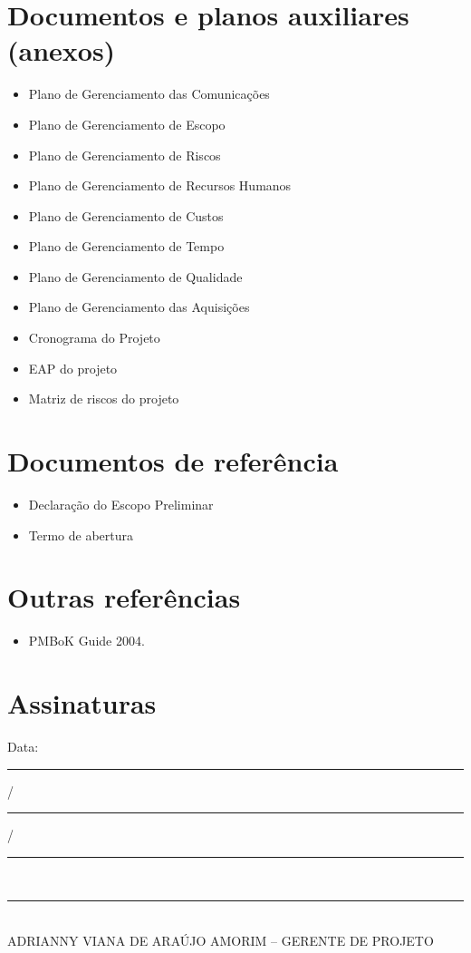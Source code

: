 \section*{Documentos e planos auxiliares (anexos)}
\begin{itemize}
\item Plano de Gerenciamento das Comunicações
\item Plano de Gerenciamento de Escopo
\item Plano de Gerenciamento de Riscos
\item Plano de Gerenciamento de Recursos Humanos
\item Plano de Gerenciamento de Custos
\item Plano de Gerenciamento de Tempo
\item Plano de Gerenciamento de Qualidade
\item Plano de Gerenciamento das Aquisições
\item Cronograma do Projeto
\item EAP do projeto
\item Matriz de riscos do projeto


\end{itemize}

\section*{Documentos de referência}
\begin{itemize}
\item Declaração do Escopo Preliminar
\item Termo de abertura
\end{itemize}

\section*{Outras referências}
\begin{itemize}
\item PMBoK Guide 2004.
\end{itemize}

\section*{Assinaturas}
\begin{center}
Data: \rule{0.5cm}{0.1mm}/\rule{0.5cm}{0.1mm}/\rule{1cm}{0.1mm}     \\
\rule{13cm}{0.1mm}\\
ADRIANNY VIANA DE ARAÚJO AMORIM – GERENTE DE PROJETO\\

\end{center}
% 